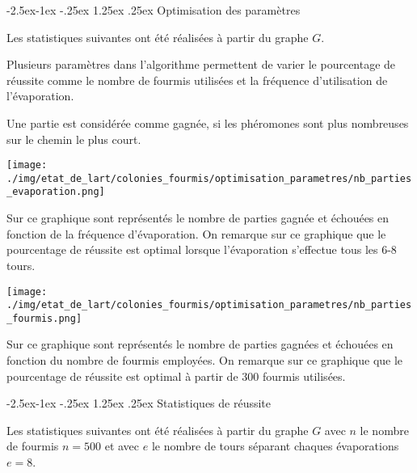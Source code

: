 \documentclass[
12pt,
french,
]{article}
\makeatletter
\let\origfigure\figure
\let\endorigfigure\endfigure
\renewenvironment{figure}[1][2] {
  \expandafter\origfigure\expandafter[H]
} {
  \endorigfigure
}
\renewcommand\paragraph{\@startsection{paragraph}{4}{\z@}%
        {-2.5ex\@plus -1ex \@minus -.25ex}%
        {1.25ex \@plus .25ex}%
        {\normalfont\normalsize\bfseries}}
\makeatother
\begin{document}
\hypertarget{optimisation-des-paramuxe8tres}{%
\paragraph{Optimisation des
paramètres}\label{optimisation-des-paramuxe8tres}}

Les statistiques suivantes ont été réalisées à partir du graphe \(G\).

Plusieurs paramètres dans l'algorithme permettent de varier le
pourcentage de réussite comme le nombre de fourmis utilisées et la
fréquence d'utilisation de l'évaporation.

Une partie est considérée comme gagnée, si les phéromones sont plus
nombreuses sur le chemin le plus court.

\begin{figure}
\centering
\texttt{[image: ./img/etat\_de\_lart/colonies\_fourmis/optimisation\_parametres/nb\_parties\_evaporation.png]}
\caption{Graphique sur l'optimisation de fréquence d'évaporation}
\end{figure}

Sur ce graphique sont représentés le nombre de parties gagnée et
échouées en fonction de la fréquence d'évaporation. On remarque sur ce
graphique que le pourcentage de réussite est optimal lorsque
l'évaporation s'effectue tous les 6-8 tours.

\begin{figure}
\centering
\texttt{[image: ./img/etat\_de\_lart/colonies\_fourmis/optimisation\_parametres/nb\_parties\_fourmis.png]}
\caption{Graphique sur l'optimisation du nombre de fourmis déployées}
\end{figure}

Sur ce graphique sont représentés le nombre de parties gagnées et
échouées en fonction du nombre de fourmis employées. On remarque sur ce
graphique que le pourcentage de réussite est optimal à partir de 300
fourmis utilisées.

\hypertarget{statistiques-de-ruxe9ussite}{%
\paragraph{Statistiques de réussite}\label{statistiques-de-ruxe9ussite}}

Les statistiques suivantes ont été réalisées à partir du graphe \(G\)
avec \(n\) le nombre de fourmis \(n = 500\) et avec \(e\) le nombre de
tours séparant chaques évaporations \(e = 8\).
\end{document}
